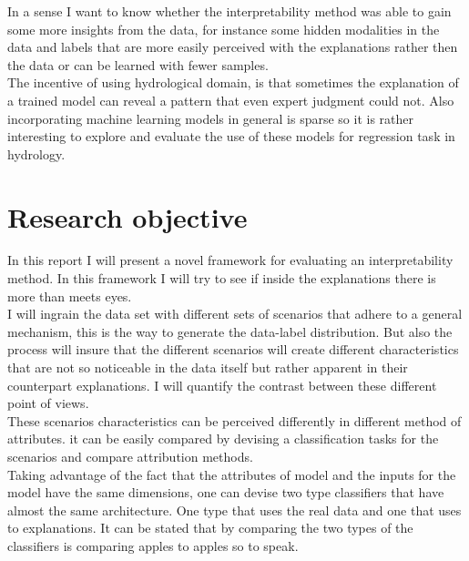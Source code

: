 \documentclass[12pt]{report}
\begin{document}
In a sense I want to know whether the interpretability method was able to gain some more insights from the data, for instance some hidden modalities in the data and labels that are more easily perceived with the explanations rather then the data or can be learned with fewer samples. \\

The incentive of using hydrological domain, is that sometimes the explanation of a trained model can reveal a pattern that even expert judgment could not. Also incorporating machine learning models in general is sparse so it is rather interesting to explore and evaluate the use of these models for regression task in hydrology. \\

\newpage
\chapter{Research objective } 

In this report I will present a novel framework for evaluating an interpretability method. In this framework I will try to see if inside the explanations there is more than meets eyes. \\

I will ingrain the data set with different sets of scenarios that adhere to a general mechanism, this is the way to generate the data-label distribution. But also the process will insure that the different scenarios will create different characteristics that are not so noticeable in the data itself but rather apparent in their counterpart explanations. I will quantify the contrast between these different point of views. \\

These scenarios characteristics can be perceived differently in different method of attributes. it can be easily compared by devising a classification tasks for the scenarios and compare attribution methods.\\

Taking advantage of the fact that the attributes of model and the inputs for the model have the same dimensions, one can devise two type classifiers that have almost the same architecture. One type that uses the real data and one that uses to explanations. It can be stated that by comparing the two types of the classifiers is comparing  apples to apples so to speak. \\
\end{document}
